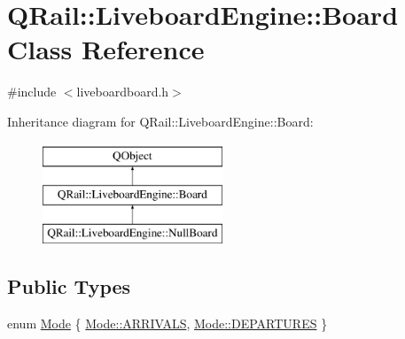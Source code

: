 \hypertarget{classQRail_1_1LiveboardEngine_1_1Board}{}\section{Q\+Rail\+::Liveboard\+Engine\+::Board Class Reference}
\label{classQRail_1_1LiveboardEngine_1_1Board}


{\ttfamily \#include $<$liveboardboard.\+h$>$}

Inheritance diagram for Q\+Rail\+::Liveboard\+Engine\+::Board\+:\begin{figure}[H]
\begin{center}
\leavevmode
\includegraphics[height=3.000000cm]{classQRail_1_1LiveboardEngine_1_1Board}
\end{center}
\end{figure}
\subsection*{Public Types}
\begin{DoxyCompactItemize}
\item 
enum \mbox{\hyperlink{classQRail_1_1LiveboardEngine_1_1Board_a0ab6d318f405895f62c6e98cb2d86c6e}{Mode}} \{ \mbox{\hyperlink{classQRail_1_1LiveboardEngine_1_1Board_a0ab6d318f405895f62c6e98cb2d86c6ea2906f1567c46a28f5a256a77e6aca76a}{Mode\+::\+A\+R\+R\+I\+V\+A\+LS}}, 
\mbox{\hyperlink{classQRail_1_1LiveboardEngine_1_1Board_a0ab6d318f405895f62c6e98cb2d86c6ea560e6dfa758a32c703224545b841a386}{Mode\+::\+D\+E\+P\+A\+R\+T\+U\+R\+ES}}
 \}
\end{DoxyCompactItemize}
